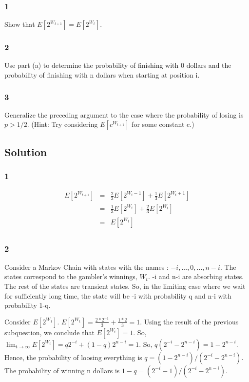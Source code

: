 \documentclass[10pt]{amsart}
\theoremstyle{remark}
\begin{document}
\subsubsection{1} Show that $ E[2^{W_{t+1}}]=E[2^{W_{t}}]$.
\subsubsection{2} Use part (a) to determine the probability of finishing with 0 dollars and the probability of finishing with n dollars when starting at position i.
\subsubsection{3} Generalize the preceding argument to the case where the probability of losing is $p>1/2$. (Hint: Try considering $E[c^{W_{t+1}}]$ for some constant c.)


\subsection{Solution}

\subsubsection{1}
\begin{eqnarray}
E[2^{W_{t+1}}] &=& \frac{2}{3}E[2^{W_{t}-1}] + \frac{1}{3}E[2^{W_{t}+1}]\\
&=& \frac{1}{3}E[2^{W_{t}}] + \frac{2}{3}E[2^{W_{t}}]\\
&=& E[2^{W_{t}}]\\
\end{eqnarray}

\subsubsection{2}
Consider a Markov Chain with states with the names : $-i, ..., 0, ..., n-i$. The states correspond to the gambler's winnings, $W_{t}$. -i and n-i are absorbing states. The rest of the states are transient states. So, in the limiting case where we wait for sufficiently long time, the state will be -i with probability q and n-i with probability 1-q.

Consider $E[2^{W_{1}}]$. $E[2^{W_{1}}] = \frac{2*2^{-1}}{3} + \frac{1*2}{3} = 1$. Using the result of the previous subquestion, we conclude that $E[2^{W_{t}}]=1$. So, $\lim_{t \to \infty}E[2^{W_{t}}] = q2^{-i}+(1-q)2^{n-i} =  1$. So, $q(2^{-i}-2^{n-i}) = 1-2^{n-i}$. Hence, the probability of loosing everything is $q= (1-2^{n-i})/(2^{-i}-2^{n-i})$. The probability of winning n dollars is $1-q=(2^{-i}-1)/(2^{-i}-2^{n-i})$.
\end{document}
